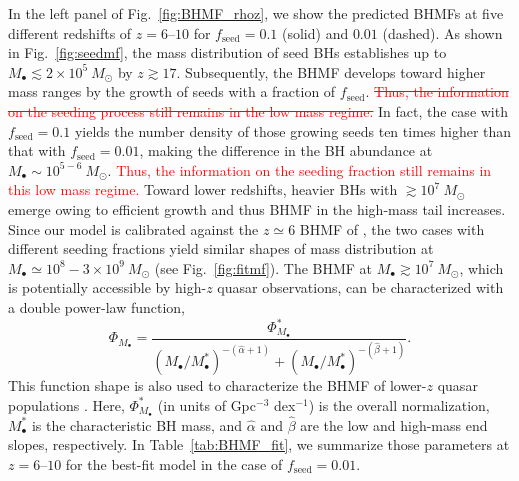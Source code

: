 \documentclass[twocolumn, twocolappendix]{aastex63}
\newcommand{\Msun}{M_\odot}
\newcommand{\fseed}{f_\mathrm{seed}}
\newcommand{\red}[1]{\textcolor{red}{ #1}}
\begin{document}
\begin{CJK*}{UTF8}{gbsn}
In the left panel of Fig.~\ref{fig:BHMF_rhoz}, we show the predicted BHMFs at five different redshifts of $z=6$--$10$
for $\fseed=0.1$ (solid) and $0.01$ (dashed).
As shown in Fig.~\ref{fig:seedmf}, the mass distribution of seed BHs establishes up to $M_\bullet \lesssim 2\times10^5~\Msun$ by $z\gtrsim 17$.
Subsequently, the BHMF develops toward higher mass ranges by the growth of seeds with a fraction of $\fseed$.
\red{\sout{
Thus, the information on the seeding process still remains in the low mass regime.}}
In fact, the case with $\fseed=0.1$ yields the number density of those growing seeds ten times higher than that with $\fseed =0.01$,
making the difference in the BH abundance at $M_\bullet \sim 10^{5-6}~\Msun$.
\red{
Thus, the information on the seeding fraction still remains in this low mass regime.}
Toward lower redshifts, heavier BHs with $\gtrsim 10^7~\Msun$ emerge owing to efficient growth
and thus BHMF in the high-mass tail increases.
Since our model is calibrated against the $z\simeq 6$ BHMF of ,
the two cases with different seeding fractions yield similar shapes of mass distribution at $M_\bullet \simeq 10^8-3\times 10^9~\Msun$ (see Fig.~\ref{fig:fitmf}).
The BHMF at $M_\bullet \gtrsim 10^7~\Msun$, which is potentially accessible by high-$z$ quasar observations,
can be characterized with a double power-law function, 
%
\begin{equation}
\Phi_{M_\bullet}=\frac{\Phi_{M_\bullet}^\ast}{(M_\bullet/M_{\bullet}^\ast)^{-(\hat \alpha+1)} + (M_\bullet/M_{\bullet}^\ast)^{-(\hat \beta+1)}}.
\end{equation}
%
This function shape is also used to characterize the BHMF of lower-$z$ quasar populations
\citep[e.g.,][]{2013ApJ...764...45K,2015MNRAS.447.2085S}.
Here, $\Phi_{M_\bullet}^\ast$ (in units of Gpc$^{-3}$ dex$^{-1}$) is the overall normalization, $M_\bullet^\ast$ is the characteristic BH mass,
and $\hat \alpha$ and $\hat \beta$ are the low and high-mass end slopes, respectively.
In Table~\ref{tab:BHMF_fit}, we summarize those parameters at $z=6$--$10$ for the best-fit model in the case of $\fseed=0.01$.
%





\end{CJK*}
\end{document}
